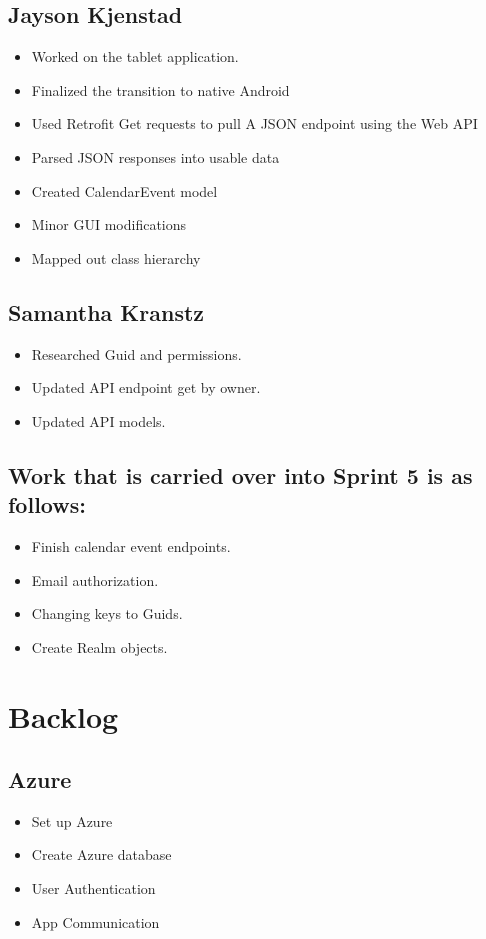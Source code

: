 \documentclass{article}
\begin{document}
{\subsection*{Jayson Kjenstad}
\begin{itemize}
\item Worked on the tablet application.
\item Finalized the transition to native Android
\item Used Retrofit Get requests to pull A JSON endpoint using the Web API
\item Parsed JSON responses into usable data
\item Created CalendarEvent model
\item Minor GUI modifications
\item Mapped out class hierarchy 

\end{itemize}

\subsection*{Samantha Kranstz}
\begin{itemize}
\item Researched Guid and permissions.
\item Updated API endpoint get by owner.
\item Updated API models.
\end{itemize}


\subsection*{Work that is carried over into Sprint 5 is as follows:}
\begin{itemize}
\item Finish calendar event endpoints.
\item Email authorization.
\item Changing keys to Guids.
\item Create Realm objects.
\end{itemize}

\section*{Backlog}
\subsection*{Azure}
\begin{itemize}
\item Set up Azure
\item Create Azure database
\item User Authentication
\item App Communication
\end{itemize}

}
\end{document}
